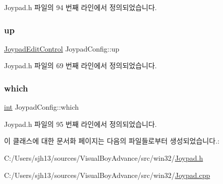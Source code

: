 Joypad.\+h 파일의 94 번째 라인에서 정의되었습니다.

\mbox{\label{class_joypad_config_a65379815cbe3f6b1d63d6d6655be22dd}} 
\subsubsection{\texorpdfstring{up}{up}}
{\footnotesize\ttfamily \mbox{\hyperlink{class_joypad_edit_control}{Joypad\+Edit\+Control}} Joypad\+Config\+::up}



Joypad.\+h 파일의 69 번째 라인에서 정의되었습니다.

\mbox{\label{class_joypad_config_ad71f1ad36754d788de00eb4bb5630dda}} 
\subsubsection{\texorpdfstring{which}{which}}
{\footnotesize\ttfamily \mbox{\hyperlink{_util_8cpp_a0ef32aa8672df19503a49fab2d0c8071}{int}} Joypad\+Config\+::which\hspace{0.3cm}{\ttfamily [protected]}}



Joypad.\+h 파일의 95 번째 라인에서 정의되었습니다.



이 클래스에 대한 문서화 페이지는 다음의 파일들로부터 생성되었습니다.\+:\begin{DoxyCompactItemize}
\item 
C\+:/\+Users/sjh13/sources/\+Visual\+Boy\+Advance/src/win32/\mbox{\hyperlink{_joypad_8h}{Joypad.\+h}}\item 
C\+:/\+Users/sjh13/sources/\+Visual\+Boy\+Advance/src/win32/\mbox{\hyperlink{_joypad_8cpp}{Joypad.\+cpp}}\end{DoxyCompactItemize}
